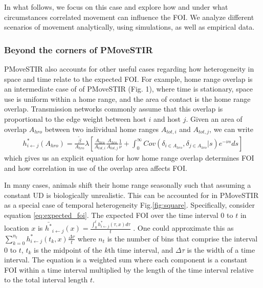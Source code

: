 \documentclass[letterpaper]{article}
\begin{document}
In what follows, we focus on this case and explore how and under what circumstances correlated movement can influence the FOI. We analyze different scenarios of movement analytically, using simulations, as well as empirical data.



\subsubsection*{Beyond the corners of PMoveSTIR}

PMoveSTIR also accounts for other useful cases regarding how heterogeneity in space and time relate to the expected FOI. For example, home range overlap is an intermediate case of of PMoveSTIR (Fig. 1), where time is stationary, space use is uniform within a home range, and the area of contact is the home range overlap.  
Transmission networks commonly assume that this overlap is proportional to the edge weight between host $i$ and host $j$. 
Given an area of overlap $A_{hro}$ between two individual home ranges $A_{tot, i}$ and $A_{tot, j}$, we can write
\begin{equation}
    \begin{aligned}
    h^*_{i \leftarrow j}(A_{hro}) = \frac{\tilde{\beta}}{A_{hro}} \lambda \left[\frac{A_{hro}}{A_{tot, i}} \frac{A_{hro}}{A_{tot, j}}  \frac{1}{\nu} + \int_{0}^{\infty} Cov(\delta_{i \in A_{hro}}, \delta_{j \in A_{hro}} | s) e^{-\nu s} ds\right]
    \end{aligned}
    \label{eq:home_range}
\end{equation}
which gives us an explicit equation for how home range overlap determines FOI and how correlation in use of the overlap area affects FOI. 

In many cases, animals shift their home range seasonally \citep{Viana2018,Richard2014} such that assuming a constant UD is biologically unrealistic. This can be accounted for in PMoveSTIR as a special case of temporal heterogeneity Fig.\ref{fig:square}.  Specifically, consider equation \ref{eq:expected_foi}. The expected FOI over the time interval 0 to $t$ in location $x$ is $\bar{h^*}_{i \leftarrow j}(x) = \frac{\int_0^t h^*_{i \leftarrow j}(\tau, x) d\tau}{t}$ \citep{Wilber2022}.  One could approximate this as $\sum_{k = 0}^{n_t} h^*_{i \leftarrow j}(t_k, x) \frac{\Delta \tau}{t}$ where $n_t$ is the number of bins that comprise the interval 0 to $t$, $t_k$ is the midpoint of the $k$th time interval, and $\Delta \tau$ is the width of a time interval.  The equation is a weighted sum where each component is a constant FOI within a time interval multiplied by the length of the time interval relative to the total interval length $t$.  
\end{document}
